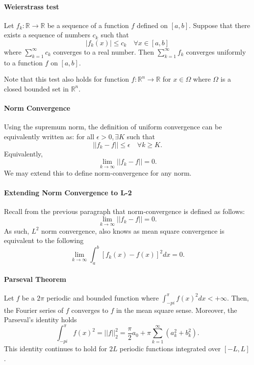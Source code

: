 \documentclass[12pt, letterpaper]{article}
\begin{document}
    \paragraph{Weierstrass test}
    Let \(f_k: \mathbb{R}\to \mathbb{R}\) be a sequence of a function \(f\) defined on \([a, b]\).
    Suppose that there exists a sequence of numbers \(c_k\) such that
    \[|f_k(x)| \leq c_k \quad \forall x\in [a, b]\]
    where \(\sum_{k=1}^\infty c_k\) converges to a real number.
    Then
    \(\sum_{k=1}^\infty f_k\) converges uniformly to a function \(f\) on \([a, b]\).

    Note that this test also holds for function \(f: \mathbb{R}^n \to \mathbb{R}\) for \(x\in \Omega\) where \(\Omega\) is a closed bounded set in \(\mathbb{R}^n\).

    \paragraph{Norm Convergence}
    Using the supremum norm, the definition of uniform convergence can be equivalently written as:
    for all \(\epsilon > 0, \exists K\) such that
    \[
        ||f_k - f|| \leq \epsilon \quad \forall k \geq K.
    \]
    Equivalently,
    \[\lim_{k\to\infty} ||f_k - f|| = 0.\]
    We may extend this to define norm-convergence for any norm.

    \paragraph{Extending Norm Convergence to L-2}
    Recall from the previous paragraph that norm-convergence is defined as follows:
    \[\lim_{k\to\infty} ||f_k - f|| = 0.\]
    As such, \(L^2\) norm convergence, also knows as mean square convergence
    is equivalent to the following
    \[\lim_{k\to\infty} \int_a^b [f_k(x)-f(x)]^2 dx = 0.\]

    \paragraph{Parseval Theorem}
    Let \(f\) be a \(2\pi\) periodic and bounded function where
    \(\int_{-pi}^\pi f(x)^2 dx < +\infty\). Then, the Fourier series of \(f\) converges to \(f\) in the mean square sense. Moreover, the Parseval's
    identity holds
    \[
    \int_{-pi}^\pi f(x)^2 = ||f||_2^2 = \frac{\pi}{2}a_0 +
    \pi \sum_{k=1}^\infty  (a_k^2 +b_k^2).
    \]
    This identity continues to hold for \(2L\) periodic functions integrated
    over \([-L, L]\).
\end{document}
